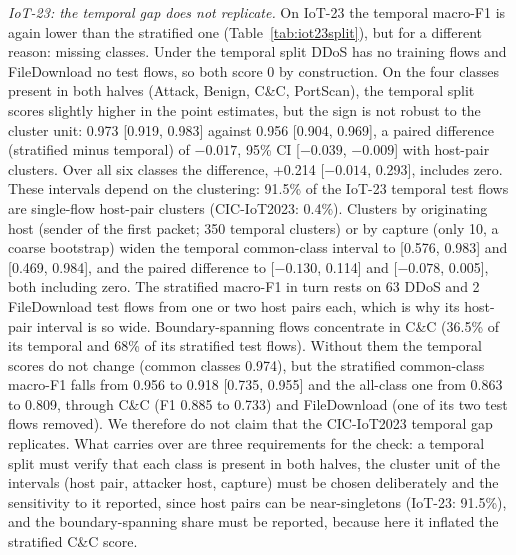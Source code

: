 \emph{IoT-23: the temporal gap does not replicate.} On IoT-23 the temporal macro-F1 is again lower than the stratified one (Table~\ref{tab:iot23split}), but for a different reason: missing classes. Under the temporal split DDoS has no training flows and FileDownload no test flows, so both score 0 by construction. On the four classes present in both halves (Attack, Benign, C\&C, PortScan), the temporal split scores slightly higher in the point estimates, but the sign is not robust to the cluster unit: 0.973 [0.919, 0.983] against 0.956 [0.904, 0.969], a paired difference (stratified minus temporal) of $-0.017$, 95\% CI [$-0.039$, $-0.009$] with host-pair clusters. Over all six classes the difference, +0.214 [$-0.014$, 0.293], includes zero. These intervals depend on the clustering: 91.5\% of the IoT-23 temporal test flows are single-flow host-pair clusters (CIC-IoT2023: 0.4\%). Clusters by originating host (sender of the first packet; 350 temporal clusters) or by capture (only 10, a coarse bootstrap) widen the temporal common-class interval to [0.576, 0.983] and [0.469, 0.984], and the paired difference to [$-0.130$, 0.114] and [$-0.078$, 0.005], both including zero. The stratified macro-F1 in turn rests on 63 DDoS and 2 FileDownload test flows from one or two host pairs each, which is why its host-pair interval is so wide. Boundary-spanning flows concentrate in C\&C (36.5\% of its temporal and 68\% of its stratified test flows). Without them the temporal scores do not change (common classes 0.974), but the stratified common-class macro-F1 falls from 0.956 to 0.918 [0.735, 0.955] and the all-class one from 0.863 to 0.809, through C\&C (F1 0.885 to 0.733) and FileDownload (one of its two test flows removed). We therefore do not claim that the CIC-IoT2023 temporal gap replicates. What carries over are three requirements for the check: a temporal split must verify that each class is present in both halves, the cluster unit of the intervals (host pair, attacker host, capture) must be chosen deliberately and the sensitivity to it reported, since host pairs can be near-singletons (IoT-23: 91.5\%), and the boundary-spanning share must be reported, because here it inflated the stratified C\&C score.
